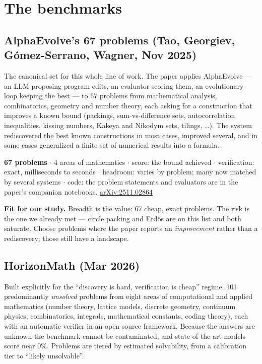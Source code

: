 \documentclass[11pt]{article}
\newcommand{\facts}[1]{\par\vspace{2pt}\noindent\colorbox{panel}{\parbox{\dimexpr\textwidth-2\fboxsep}{\small #1}}\vspace{4pt}}
\newcommand{\fit}[1]{\par\noindent\textbf{Fit for our study.} #1}
\begin{document}
\section{The benchmarks}

\subsection{AlphaEvolve's 67 problems (Tao, Georgiev, G\'omez-Serrano, Wagner, Nov 2025)}

The canonical set for this whole line of work. The paper applies AlphaEvolve --- an LLM
proposing program edits, an evaluator scoring them, an evolutionary loop keeping the best --- to
67 problems from mathematical analysis, combinatorics, geometry and number theory, each asking
for a construction that improves a known bound (packings, sum-vs-difference sets, autocorrelation
inequalities, kissing numbers, Kakeya and Nikodym sets, tilings, \ldots). The system rediscovered
the best known constructions in most cases, improved several, and in some cases generalized a
finite set of numerical results into a formula.

\facts{\textbf{67 problems} $\cdot$ 4 areas of mathematics $\cdot$ score: the bound achieved
$\cdot$ verification: exact, milliseconds to seconds $\cdot$ headroom: varies by problem; many now
matched by several systems $\cdot$ code: the problem statements and evaluators are in the paper's
companion notebooks. \href{https://arxiv.org/abs/2511.02864}{arXiv:2511.02864}}

\fit{Breadth is the value: 67 cheap, exact problems. The risk is the one we already met --- circle
packing and Erd\H{o}s are on this list and both saturate. Choose problems where the paper reports
an \emph{improvement} rather than a rediscovery; those still have a landscape.}

\subsection{HorizonMath (Mar 2026)}

Built explicitly for the ``discovery is hard, verification is cheap'' regime. 101 predominantly
\emph{unsolved} problems from eight areas of computational and applied mathematics (number
theory, lattice models, discrete geometry, continuum physics, combinatorics, integrals,
mathematical constants, coding theory), each with an automatic verifier in an open-source
framework. Because the answers are unknown the benchmark cannot be contaminated, and
state-of-the-art models score near 0\%. Problems are tiered by estimated solvability, from a
calibration tier to ``likely unsolvable''.
\end{document}
